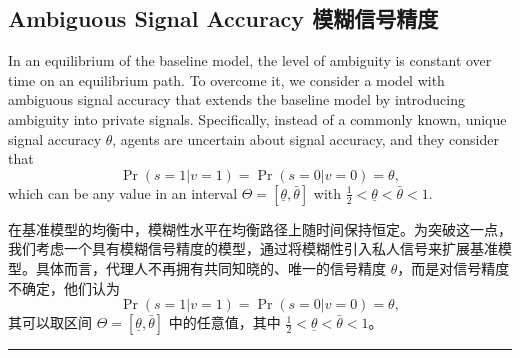 \documentclass[12pt,a4paper]{article}
\newenvironment{original}{%
  \par\vspace{4pt}\noindent%
  \color{black}%
  \ignorespaces
}{%
  \par\vspace{2pt}%
}
\newenvironment{translation}{%
  \par\vspace{2pt}\noindent%
  \color{transblue}%
  \ignorespaces
}{%
  \par\vspace{4pt}\hrule\vspace{6pt}%
}
\begin{document}
\newpage

\subsection{Ambiguous Signal Accuracy \hfill 模糊信号精度}

\begin{original}
In an equilibrium of the baseline model, the level of ambiguity is constant over time on an equilibrium path. To overcome it, we consider a model with ambiguous signal accuracy that extends the baseline model by introducing ambiguity into private signals. Specifically, instead of a commonly known, unique signal accuracy $\theta$, agents are uncertain about signal accuracy, and they consider that
\[
\Pr(s = 1|v = 1) = \Pr(s = 0|v = 0) = \theta,
\]
which can be any value in an interval $\Theta = [\underline{\theta}, \bar{\theta}]$ with $\frac12 < \underline{\theta} < \bar{\theta} < 1$.
\end{original}
\begin{translation}
在基准模型的均衡中，模糊性水平在均衡路径上随时间保持恒定。为突破这一点，我们考虑一个具有模糊信号精度的模型，通过将模糊性引入私人信号来扩展基准模型。具体而言，代理人不再拥有共同知晓的、唯一的信号精度 $\theta$，而是对信号精度不确定，他们认为
\[
\Pr(s = 1|v = 1) = \Pr(s = 0|v = 0) = \theta,
\]
其可以取区间 $\Theta = [\underline{\theta}, \bar{\theta}]$ 中的任意值，其中 $\frac12 < \underline{\theta} < \bar{\theta} < 1$。
\end{translation}
\end{document}
